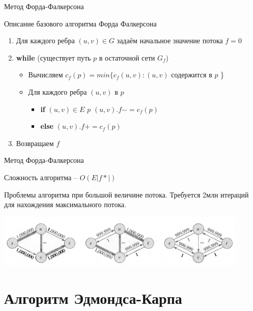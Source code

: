 \documentclass[10pt]{beamer}
\begin{document}
\begin{frame}[fragile]{Метод Форда-Фалкерсона}

Описание базового алгоритма Форда Фалкерсона
\begin{enumerate}
    \item Для каждого ребра $(u,v) \in G$ задаём начальное значение потока $f=0$
    \item \textbf{while} (существует путь $p$ в остаточной сети $G_f$)
        
        \begin{itemize}
            \item Вычисляем $c_f(p) = min\{ c_f(u,v): (u,v)$ содержится в $p$ \}
            \item Для каждого ребра $(u,v)$ в $p$ 
                \begin{itemize}
                    \item \textbf{if} $(u,v) \in E$  $p$ $(u,v).f -= c_f(p) $ 
                    \item \textbf{else} $(u,v).f += c_f(p) $ 
                \end{itemize}
        \end{itemize}
    \item Возвращаем $f$
\end{enumerate}

\end{frame}

\begin{frame}[fragile]{Метод Форда-Фалкерсона}

Сложность алгоритма -- $O( E |f*|)$

Проблемы алгоритма при большой величине потока. Требуется 2млн итераций для нахождения максимального потока.
\begin{center}
    \includegraphics[width=12cm]{Term_2/Source/images/8-ford-falkerson-bad.png}
\end{center}

\end{frame}

\section{Алгоритм Эдмондса-Карпа}
\end{document}
